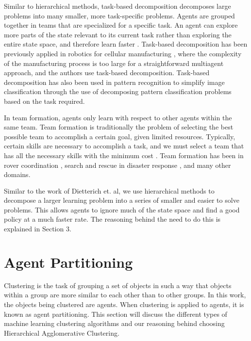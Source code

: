 \documentclass[onehalf,11pt]{beavtex}
\begin{document}
Similar to hierarchical methods, task-based decomposition decomposes large problems into many smaller, more task-specific problems. Agents are grouped together in teams that are specialized for a specific task. An agent can explore more parts of the state relevant to its current task rather than exploring the entire state space, and therefore learn faster \cite{Doucette:2012:HTD:2330163.2330178, 4708962}. Task-based decomposition has been previously applied in robotics for cellular manufacturing \cite{399902}, where the complexity of the manufacturing process is too large for a straightforward multiagent approach, and the authors use task-based decomposition.  Task-based decomposition has also been used in pattern recognition \cite{788664} to simplify image classification through the use of decomposing pattern classification problems based on the task required.

In team formation, agents only learn with respect to other agents within the same team. Team formation is traditionally the problem of selecting the best possible team to accomplish a certain goal, given limited resources. Typically, certain skills are necessary to accomplish a task, and we must select a team that has all the necessary skills with the minimum cost \cite{Guttmann_makingallocations, Guestrin:2002:CRL:645531.757784}. Team formation has been in rover coordination \cite{Knudson:2010:RCA:1838206.1838422}, search and rescue in disaster response \cite{Guestrin:2002:CRL:645531.757784, Tambe97towardsflexible}, and many other domains.

Similar to the work of Dietterich et. al, we use hierarchical methods to decompose a larger learning problem into a series of smaller and easier to solve problems. This allows agents to ignore much of the state space and find a good policy at a much faster rate. The reasoning behind the need to do this is explained in Section 3.

\section{Agent Partitioning}

Clustering is the task of grouping a set of objects in such a way that objects within a group are more similar to each other than to other groups. In this work, the objects being clustered are agents. When clustering is applied to agents, it is known as agent partitioning. This section will discuss the  different types of machine learning clustering algorithms and our reasoning behind choosing Hierarchical Agglomerative Clustering.
\end{document}
